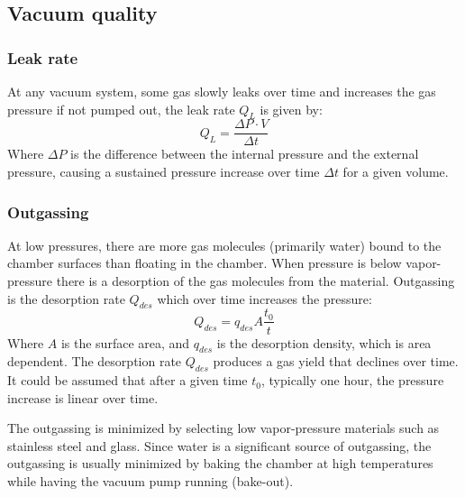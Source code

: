 \documentclass[\main/master.tex]{subfiles}
\begin{document}
\subsection{Vacuum quality}
\subsubsection{Leak rate}
At any vacuum system, some gas slowly leaks over time and increases the gas pressure if not pumped out, the leak rate $Q_L$ is given by: 
\begin{equation}
Q_L = \frac{\Delta P\cdot V}{\Delta t}  \label{eqn:leak rate}
\end{equation}
Where $\Delta P$ is the difference between the internal pressure and the external pressure, causing a sustained pressure increase over time $\Delta t$ for a given volume.


\subsubsection{Outgassing}
\par\noindent
At low pressures, there are more gas molecules (primarily water) bound to the chamber surfaces than floating in the chamber. When pressure is below vapor-pressure there is a desorption of the gas molecules from the material. Outgassing is the desorption rate $Q_{des}$ which over time increases the pressure:
\begin{equation}
Q_{des} = q_{des} A\frac{t_0}{t}  \label{eqn:desorption rate}
\end{equation}
Where $A$ is the surface area, and $q_{des}$ is the desorption density, which is area dependent. The desorption rate $Q_{des}$ produces a gas yield that declines over time. It could be assumed that after a given time $t_0$, typically one hour, the pressure increase is linear over time.
\par\noindent
The outgassing is minimized by selecting low vapor-pressure materials such as stainless steel and glass. Since water is a significant source of outgassing, the outgassing is usually minimized by baking the chamber at high temperatures while having the vacuum pump running (bake-out).
\end{document}
